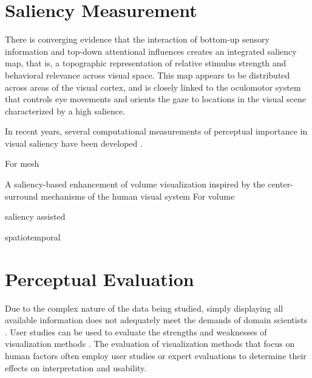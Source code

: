 \section{Saliency Measurement}
\cite{treue_visual_2003}
 There is converging
 evidence that the interaction of bottom-up sensory information
 and top-down attentional inﬂuences creates an integrated
 saliency map, that is, a topographic representation of relative
 stimulus strength and behavioral relevance across visual space.
 This map appears to be distributed across areas of the visual
 cortex, and is closely linked to the oculomotor system that
 controls eye movements and orients the gaze to locations in the
 visual scene characterized by a high salience.


In recent years, several computational measurements of perceptual importance in visual saliency have been developed \cite{itti_model_1998} \cite{harel_graph-based_2006} \cite{duan_visual_2011}.

For mesh \cite{lee_mesh_2005}

A saliency-based enhancement of volume visualization inspired by the center-surround mechanisms of the human
visual system
For volume \cite{kim_saliency-guided_2006}
\cite{kim_saliency-guided_2008}

saliency assisted
\cite{shen_save:_2014}
\cite{wang_saliency-aware_2013}

spatiotemporal
\cite{shen_spatiotemporal_2015}









\section{Perceptual Evaluation}

Due to the complex nature of the data being studied, simply displaying all available information does not adequately meet the demands of domain scientists \cite{anderson_evaluating_2012}.
User studies can be used to evaluate the strengths and weaknesses of visualization methods \cite{christopher_thoughts_2003}.
The evaluation of visualization methods that focus on human factors often employ user studies or expert evaluations to determine their effects on interpretation and usability.

